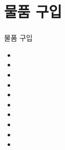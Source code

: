 \documentclass[aspectratio=1610,20pt,xcolor=pdftex,dvipsnames,table,handout]{beamer}
\begin{document}
		\section{물품 구입}
		\begin{frame} [t,plain]
		\frametitle{}
			\begin{block} {물품 구입}
			\setlength{\leftmargini}{1em}			
			\begin{itemize}
				\item 	\hrulefill
				\item 	\hrulefill
				\item 	\hrulefill
				\item 	\hrulefill
				\item 	\hrulefill
				\item 	\hrulefill
				\item 	\hrulefill
				\item 	\hrulefill
				\item 	\hrulefill
				\item 	\hrulefill

			\end{itemize}
			\end{block}						
		\end{frame}					








\end{document}
